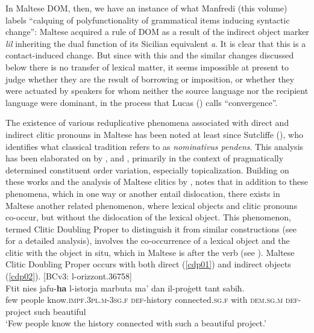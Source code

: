 \documentclass[output=paper]{langsci/langscibook}
\begin{document}
In Maltese DOM, then, we have an instance of what Manfredi (this volume) labels ``calquing of polyfunctionality of grammatical items inducing syntactic change'': Maltese acquired a rule of DOM as a result of the indirect object marker \textit{lil} inheriting the dual function of its Sicilian equivalent \textit{a}. It is clear that this is a contact-induced change. But since with this and the similar changes discussed below there is no transfer of lexical matter, it seems impossible at present to judge whether they are the result of borrowing or imposition, or whether they were actuated by speakers for whom neither the source language nor the recipient language were dominant, in the process that Lucas (\citeyear{Lucas2015}) calls ``convergence''. 

The existence of various reduplicative phenomena associated with direct and indirect clitic pronouns in Maltese has been noted at least since Sutcliffe (\citeyear[179]{sutcliffe}), who identifies what classical tradition refers to as \textit{nominativus pendens}. This analysis has been elaborated on by \cite{fabri1993}, \cite{BorgAzzopardi-Alexander1997} and \cite{fabriborgtopicfocus}, primarily in the context of pragmatically determined constituent order variation, especially topicalization. Building on these works and the analysis of Maltese clitics by \cite{camilleri2011}, \cite{bulbul2014} notes that in addition to these phenomena, which in one way or another entail dislocation, there exists in Maltese another related phenomenon, where lexical objects and clitic pronouns co-occur, but without the dislocation of the lexical object. This phenomenon, termed Clitic Doubling Proper to distinguish it from similar constructions (see \citealt{krapovacinque2008} for a detailed analysis), involves the co-occurrence of a lexical object and the clitic with the object in situ, which in Maltese is after the verb (see \citealt{bulbul2018}). Maltese Clitic Doubling Proper occurs with both direct (\ref{cdp01}) and indirect objects (\ref{cdp02}).
\ea\label{cdp01} 
{[BCv3: l-orizzont.36758]}\\
\gll Ftit nies jafu-\textbf{ha} l-istorja marbuta ma' dan il-proġett tant sabiħ.\\
	few people know.\textsc{impf.3pl.m}-\textsc{3sg.f} \textsc{def}-history connected.\textsc{sg.f} with \textsc{dem.sg.m} \textsc{def}-project such beautiful\\
	\glt `Few people know the history connected with such a beautiful project.'\\
\end{document}
